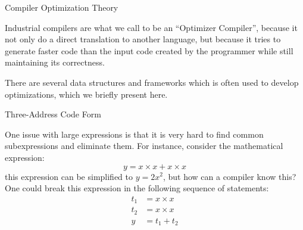 \begin{section}{Compiler Optimization Theory}\label{sec:optimization}

Industrial compilers are what we call to be an ``Optimizer Compiler'', because
it not only do a direct translation to another language, but because it
tries to generate faster code than the input code created by the programmer
while still maintaining its correctness.

There are several data structures and frameworks which is often used to
develop optimizations, which we briefly present here.

%
%
%
%
%
%

\begin{subsection}{Three-Address Code Form}

One issue with large expressions is that it is very hard to find common
subexpressions and eliminate them. For instance, consider the mathematical
expression:
$$y = x \times x + x \times x $$
this expression can be simplified to $y = 2x^2$, but how
can a compiler know this? One could break this expression in the following
sequence of statements:
\begin{align}
t_1 &= x \times x \nonumber \\
t_2 &= x \times x \nonumber \\
y &= t_1 + t_2 \nonumber
\end{align}


\end{subsection}
\end{section}
